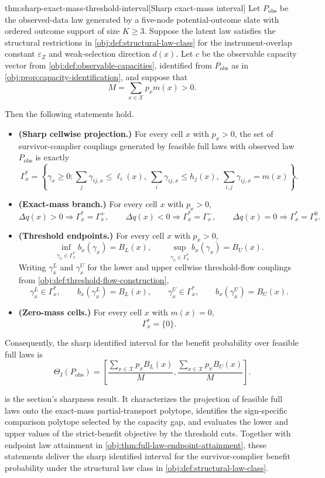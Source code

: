 \begin{theoremv}{thm:sharp-exact-mass-threshold-interval}[Sharp exact-mass interval]
Let \(P_{\mathrm{obs}}\) be the observed-data law generated by a five-node potential-outcome slate with ordered outcome support of size \(K\ge 3\).  Suppose the latent law satisfies the structural restrictions in \cref{obj:def:structural-law-class} for the instrument-overlap constant \(\varepsilon_Z\) and weak-selection direction \(d(x)\).  Let \(c\) be the observable capacity vector from \cref{obj:def:observable-capacities}, identified from \(P_{\mathrm{obs}}\) as in \cref{obj:prop:capacity-identification}, and suppose that
\[
M=\sum_{x\in\mathcal X}p_xm(x)>0.
\]

Then the following statements hold.
\begin{itemize}
\item \textbf{(Sharp cellwise projection.)} For every cell \(x\) with \(p_x>0\), the set of survivor-complier couplings generated by feasible full laws with observed law \(P_{\mathrm{obs}}\) is exactly
\[
\Gamma_x^{\ast}
=
\left\{\gamma_x\ge0:
\sum_j\gamma_{ij,x}\le \ell_i(x),\ 
\sum_i\gamma_{ij,x}\le h_j(x),\ 
\sum_{i,j}\gamma_{ij,x}=m(x)
\right\}.
\]
\item \textbf{(Exact-mass branch.)} For every cell \(x\) with \(p_x>0\),
\[
\Delta q(x)>0 \Rightarrow \Gamma_x^{\ast}=\Gamma_x^{+},\qquad
\Delta q(x)<0 \Rightarrow \Gamma_x^{\ast}=\Gamma_x^{-},\qquad
\Delta q(x)=0 \Rightarrow \Gamma_x^{\ast}=\Gamma_x^{0}.
\]
\item \textbf{(Threshold endpoints.)} For every cell \(x\) with \(p_x>0\),
\[
\inf_{\gamma_x\in\Gamma_x^{\ast}} b_x(\gamma_x)=B_L(x),
\qquad
\sup_{\gamma_x\in\Gamma_x^{\ast}} b_x(\gamma_x)=B_U(x).
\]
Writing \(\gamma_x^L\) and \(\gamma_x^U\) for the lower and upper cellwise threshold-flow couplings from \cref{obj:def:threshold-flow-construction},
\[
\gamma_x^L\in\Gamma_x^{\ast},\qquad
b_x(\gamma_x^L)=B_L(x),\qquad
\gamma_x^U\in\Gamma_x^{\ast},\qquad
b_x(\gamma_x^U)=B_U(x).
\]
\item \textbf{(Zero-mass cells.)} For every cell \(x\) with \(m(x)=0\),
\[
\Gamma_x^{\ast}=\{0\}.
\]
\end{itemize}
Consequently, the sharp identified interval for the benefit probability over feasible full laws is
\[
\Theta_I(P_{\mathrm{obs}})
=
\left[
\frac{\sum_{x\in\mathcal X}p_xB_L(x)}{M},
\frac{\sum_{x\in\mathcal X}p_xB_U(x)}{M}
\right].
\]
\end{theoremv}

 is the section's sharpness result. It characterizes the projection of feasible full laws onto the exact-mass partial-transport polytope, identifies the sign-specific comparison polytope selected by the capacity gap, and evaluates the lower and upper values of the strict-benefit objective by the threshold cuts. Together with endpoint law attainment in \cref{obj:thm:full-law-endpoint-attainment}, these statements deliver the sharp identified interval for the survivor-complier benefit probability  under the structural law class in \cref{obj:def:structural-law-class}.
